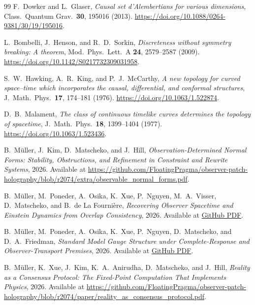 \begin{thebibliography}{99}
F.~Dowker and L.~Glaser,
\emph{Causal set d'Alembertians for various dimensions},
Class.\ Quantum Grav.\ \textbf{30}, 195016 (2013).
\url{https://doi.org/10.1088/0264-9381/30/19/195016}.

L.~Bombelli, J.~Henson, and R.~D.~Sorkin,
\emph{Discreteness without symmetry breaking: A theorem},
Mod.\ Phys.\ Lett.\ A \textbf{24}, 2579--2587 (2009).
\url{https://doi.org/10.1142/S0217732309031958}.

S.~W.~Hawking, A.~R.~King, and P.~J.~McCarthy,
\emph{A new topology for curved space--time which incorporates the causal,
differential, and conformal structures},
J.\ Math.\ Phys.\ \textbf{17}, 174--181 (1976).
\url{https://doi.org/10.1063/1.522874}.

D.~B.~Malament,
\emph{The class of continuous timelike curves determines the topology of spacetime},
J.\ Math.\ Phys.\ \textbf{18}, 1399--1404 (1977).
\url{https://doi.org/10.1063/1.523436}.

B.~M\"uller, J.~Kim, D.~Matscheko, and J.~Hill,
\emph{Observation-Determined Normal Forms: Stability, Obstructions, and Refinement in Constraint
and Rewrite Systems},
2026.
Available at \url{https://github.com/FloatingPragma/observer-patch-holography/blob/r2074/extra/observable_normal_forms.pdf}.

B.~M\"uller, M.~Poneder, A.~Osika, K.~Xue, P.~Nguyen, M.~A.~Visser, D.~Matscheko, and B.~de La Fourni\`ere,
\emph{Recovering Observer Spacetime and Einstein Dynamics from Overlap Consistency},
2026.
Available at \href{https://github.com/FloatingPragma/observer-patch-holography/blob/r2074/paper/recovering_observer_spacetime_and_einstein_dynamics_from_overlap_consistency.pdf}{GitHub PDF}.

B.~M\"uller, M.~Poneder, A.~Osika, K.~Xue, P.~Nguyen, D.~Matscheko, and D.~A.~Friedman,
\emph{Standard Model Gauge Structure under Complete-Response and Observer-Transport Premises},
2026.
Available at \href{https://github.com/FloatingPragma/observer-patch-holography/blob/r2074/paper/deriving_standard_model_gauge_structure_from_observer_overlap_consistency.pdf}{GitHub PDF}.

B.~M\"uller, K.~Xue, J.~Kim, K.~A.~Anirudha, D.~Matscheko, and J.~Hill,
\emph{Reality as a Consensus Protocol: The Fixed-Point Computation That Implements Physics},
2026.
Available at \url{https://github.com/FloatingPragma/observer-patch-holography/blob/r2074/paper/reality_as_consensus_protocol.pdf}.


\end{thebibliography}
